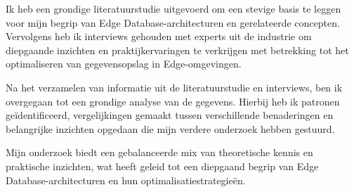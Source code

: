Ik heb een grondige literatuurstudie uitgevoerd om een stevige basis te leggen voor mijn begrip van Edge Database-architecturen en gerelateerde concepten. Vervolgens heb ik interviews gehouden met experts uit de industrie om diepgaande inzichten en praktijkervaringen te verkrijgen met betrekking tot het optimaliseren van gegevensopslag in Edge-omgevingen.

Na het verzamelen van informatie uit de literatuurstudie en interviews, ben ik overgegaan tot een grondige analyse van de gegevens. Hierbij heb ik patronen geïdentificeerd, vergelijkingen gemaakt tussen verschillende benaderingen en belangrijke inzichten opgedaan die mijn verdere onderzoek hebben gestuurd.

Mijn onderzoek biedt een gebalanceerde mix van theoretische kennis en praktische inzichten, wat heeft geleid tot een diepgaand begrip van Edge Database-architecturen en hun optimalisatiestrategieën.

